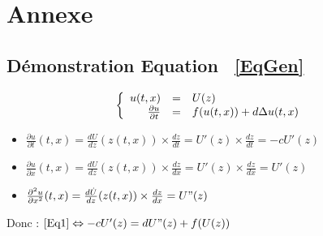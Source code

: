 \documentclass[a4paper,11pt]{article}
\begin{document}
\section{Annexe}
\subsection{Démonstration Equation ~\eqref{EqGen}}

\[
\left\{
\begin{array}{r c l}
u(t,x)&=&U(z)\\
\frac{\partial u}{\partial t}&=&f(u(t,x))+d\Delta u(t,x)
\end{array}
\right.
\]

{\setlength{\baselineskip}{1.8\baselineskip}
\large{
\begin{itemize}[label=$\bullet$]
	\item $\frac{\partial u}{\partial t}(t,x)=\frac{dU}{dz}(z(t,x))\times\frac{dz}{dt}=U'(z)\times \frac{dz}{dt}=-c U'(z)$
    \item $\frac{\partial u}{\partial x}(t,x)=\frac{dU}{dz}(z(t,x))\times\frac{dz}{dx}=U'(z)\times \frac{dz}{dx}=U'(z)$
  	\item $\frac{\partial^2 u}{\partial x^2}(t,x)=\frac{d\dot U}{dz}(z(t,x))\times\frac{dz}{dx}=U"(z)$
\end{itemize}
}
\par}
Donc : $\eqref{Eq1}\Leftrightarrow -c U'(z)=d U"(z)+f(U(z))$
\end{document}
